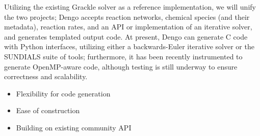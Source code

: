 Utilizing the existing Grackle
solver as a reference implementation, we will unify the two projects; Dengo
accepts reaction networks, chemical species (and their metadata), reaction
rates, and an API or implementation of an iterative solver, and generates
templated output code.  At present, Dengo can generate C code with Python
interfaces, utilizing either a backwards-Euler iterative solver or the SUNDIALS
suite of tools; furthermore, it has been recently instrumented to generate
OpenMP-aware code, although testing is still underway to ensure correctness and
scalability.

\begin{itemize}
\item Flexibility for code generation
\item Ease of construction
\item Building on existing community API
\end{itemize}
